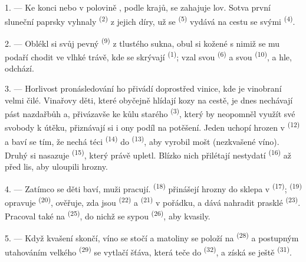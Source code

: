 1. --- Ke konci  nebo v polovině , podle krajů, se zahajuje
lov. Sotva první sluneční paprsky vyhnaly  \textsuperscript{(2)} z
jejich díry, už se  \textsuperscript{(5)} vydává na cestu se svými
 \textsuperscript{(4)}.

2. --- Oblékl si svůj pevný  \textsuperscript{(9)} z tlustého
sukna, obul si kožené  s nimiž se mu podaří chodit ve vlhké trávě, kde
se skrývají  \textsuperscript{(1)}; vzal svou 
\textsuperscript{(6)} a svou  \textsuperscript{(10)}, a hle,
odchází.

3. --- Horlivost pronásledování ho přivádí doprostřed vinice, kde je vinobraní velmi
čilé. Vinařovy děti, které obyčejně hlídají kozy na cestě, je dnes nechávají pást
nazdařbůh a, přivázavše ke kůlu starého  \textsuperscript{(3)}, který by
neopomněl využít své svobody k útěku, přiznávají si i ony podíl na potěšení. Jeden
uchopí hrozen v  \textsuperscript{(12)} a baví se tím, že
nechá téci  \textsuperscript{(14)} do 
\textsuperscript{(13)}, aby vyrobil mošt (nezkvašené víno). Druhý si nasazuje
 \textsuperscript{(15)}, který právě upletl. Blízko nich
přilétají nestydatí  \textsuperscript{(16)} až před lis, aby uloupili
hrozny.

4. --- Zatímco se děti baví, muži pracují. 
\textsuperscript{(18)} přinášejí hrozny do sklepa v 
\textsuperscript{(17)};  \textsuperscript{(19)} opravuje 
\textsuperscript{(20)}, ověřuje, zda jsou  \textsuperscript{(22)} a
 \textsuperscript{(21)} v pořádku, a dává nahradit prasklé
 \textsuperscript{(23)}. Pracoval také na 
\textsuperscript{(25)}, do nichž se sypou  \textsuperscript{(26)}, aby
kvasily.

5. --- Když kvašení skončí, víno se stočí a matoliny se položí na 
\textsuperscript{(28)} a postupným utahováním velkého 
\textsuperscript{(29)} se vytlačí šťáva, která teče do 
\textsuperscript{(32)}, a získá se ještě  \textsuperscript{(31)}.

\VUsaut{6.0mm}
\VUsaut{3.4mm}

